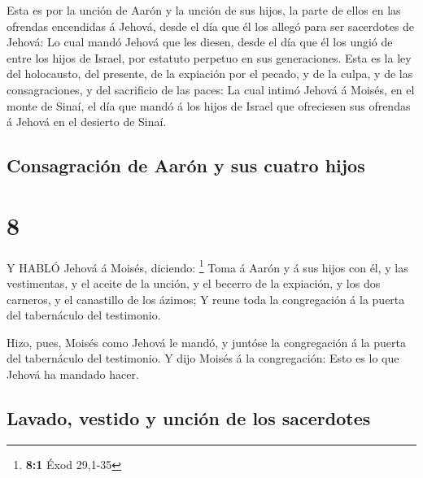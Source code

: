  Esta es por la unción de Aarón y la unción de sus hijos,
la parte de ellos en las ofrendas encendidas á Jehová, desde el día que
él los allegó para ser sacerdotes de Jehová:  Lo cual mandó
Jehová que les diesen, desde el día que él los ungió de entre los hijos
de Israel, por estatuto perpetuo en sus generaciones.  Esta
es la ley del holocausto, del presente, de la expiación por el pecado, y
de la culpa, y de las consagraciones, y del sacrificio de las paces:
 La cual intimó Jehová á Moisés, en el monte de Sinaí, el
día que mandó á los hijos de Israel que ofreciesen sus ofrendas á Jehová
en el desierto de Sinaí.

\hypertarget{consagraciuxf3n-de-aaruxf3n-y-sus-cuatro-hijos}{%
\subsection{Consagración de Aarón y sus cuatro
hijos}\label{consagraciuxf3n-de-aaruxf3n-y-sus-cuatro-hijos}}

\hypertarget{section-7}{%
\section{8}\label{section-7}}

 Y HABLÓ Jehová á Moisés, diciendo: \footnote{\textbf{8:1}
  Éxod 29,1-35}  Toma á Aarón y á sus hijos con él, y las
vestimentas, y el aceite de la unción, y el becerro de la expiación, y
los dos carneros, y el canastillo de los ázimos;  Y reune
toda la congregación á la puerta del tabernáculo del testimonio.

 Hizo, pues, Moisés como Jehová le mandó, y juntóse la
congregación á la puerta del tabernáculo del testimonio.  Y
dijo Moisés á la congregación: Esto es lo que Jehová ha mandado hacer.

\hypertarget{lavado-vestido-y-unciuxf3n-de-los-sacerdotes}{%
\subsection{Lavado, vestido y unción de los
sacerdotes}\label{lavado-vestido-y-unciuxf3n-de-los-sacerdotes}}

